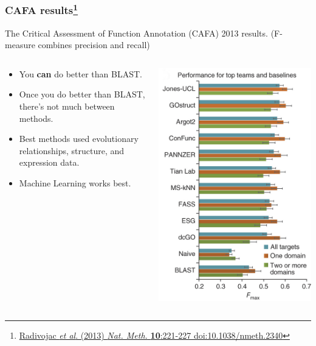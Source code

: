 \begin{frame}
  \frametitle{CAFA results\footnote{\tiny{\href{http://dx.doi.org/10.1038/nmeth.2340}{Radivojac \textit{et al}. (2013) \textit{Nat. Meth.} \textbf{10}:221-227 doi:10.1038/nmeth.2340}}}}
  The Critical Assessment of Function Annotation (CAFA) 2013 results. {\tiny(F-measure combines precision and recall)}
  \begin{columns}[T]
    \begin{column}{5cm}  
      \begin{itemize}  
        \item You \textbf{can} do better than BLAST.
        \item Once you do better than BLAST, there's not much between methods.
        \item Best methods used evolutionary relationships, structure, and expression data.
        \item Machine Learning works best.
      \end{itemize}
    \end{column}
    \begin{column}{5cm}      
      \includegraphics[height=0.65\textheight]{images/cafa_results}
    \end{column}
  \end{columns}         
\end{frame}